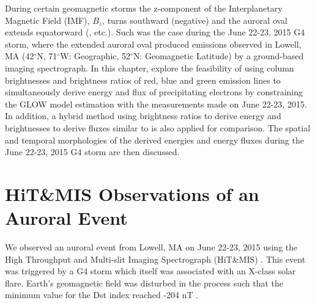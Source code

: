 \documentclass[crop=false,class=mitthesis,oneside,font=12pt]{standalone}
\begin{document}
During certain geomagnetic storms the z-component of the Interplanetary Magnetic Field (IMF), $B_z$, turns southward (negative) and the auroral oval extends equatorward (\citet{holzworthmeng,hardy}, etc.). Such was the case during the June 22-23, 2015 G4 storm, where the extended auroral oval produced emissions observed in Lowell, MA (42$^\circ$N, 71$^\circ$W: Geographic, 52$^\circ$N: Geomagnetic Latitude) by a ground-based imaging spectrograph. In this chapter, explore the feasibility of using column brightnesses and brightness ratios of red, blue and green emission lines to simultaneously derive energy and flux of precipitating electrons by constraining the GLOW model estimation with the measurements made on June 22-23, 2015. In addition, a hybrid method using brightness ratios to derive energy and brightnesses to derive fluxes similar to \cite{rees_1974} is also applied for comparison. The spatial and temporal morphologies of the derived energies and energy fluxes during the June 22-23, 2015 G4 storm are then discussed.

\section{HiT\&MIS Observations of an Auroral Event}
We observed an auroral event from Lowell, MA on June 22-23, 2015 using the High Throughput and Multi-slit Imaging Spectrograph (HiT\&MIS) \citep{hitmis}. This event was triggered by a G4 storm which itself was associated with an X-class solar flare. Earth's geomagnetic field was disturbed in the process such that the minimum
value for the Dst index reached -204 nT \citep{baker_dst}.
\end{document}
